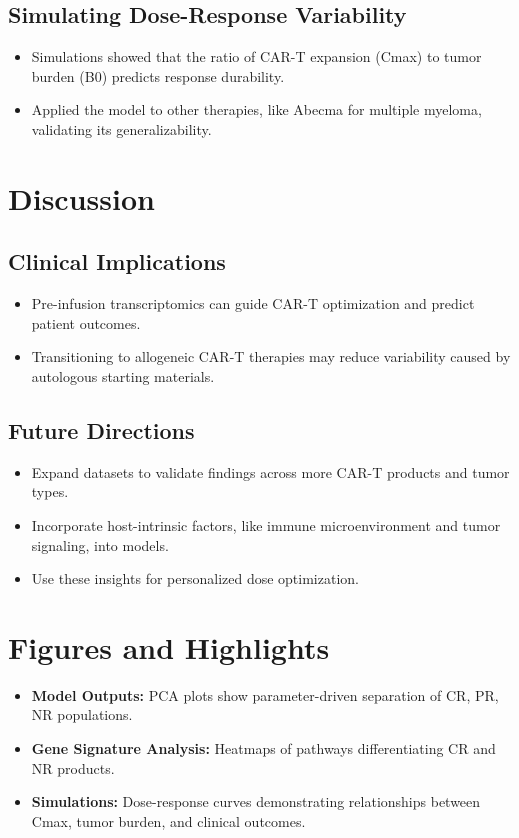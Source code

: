 \documentclass[12pt]{article}
\begin{document}
\subsection*{Simulating Dose-Response Variability}
\begin{itemize}
    \item Simulations showed that the ratio of CAR-T expansion (Cmax) to tumor burden (B0) predicts response durability.
    \item Applied the model to other therapies, like Abecma for multiple myeloma, validating its generalizability.
\end{itemize}

\section*{Discussion}

\subsection*{Clinical Implications}
\begin{itemize}
    \item Pre-infusion transcriptomics can guide CAR-T optimization and predict patient outcomes.
    \item Transitioning to allogeneic CAR-T therapies may reduce variability caused by autologous starting materials.
\end{itemize}

\subsection*{Future Directions}
\begin{itemize}
    \item Expand datasets to validate findings across more CAR-T products and tumor types.
    \item Incorporate host-intrinsic factors, like immune microenvironment and tumor signaling, into models.
    \item Use these insights for personalized dose optimization.
\end{itemize}

\section*{Figures and Highlights}
\begin{itemize}
    \item \textbf{Model Outputs:} PCA plots show parameter-driven separation of CR, PR, NR populations.
    \item \textbf{Gene Signature Analysis:} Heatmaps of pathways differentiating CR and NR products.
    \item \textbf{Simulations:} Dose-response curves demonstrating relationships between Cmax, tumor burden, and clinical outcomes.
\end{itemize}
\end{document}
